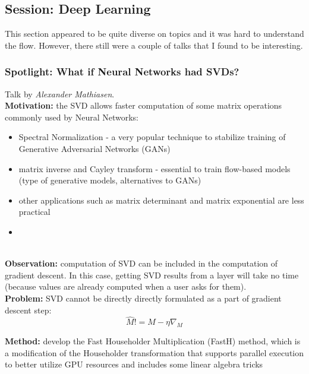 \subsection{Session: Deep Learning}

This section appeared to be quite diverse on topics and it was hard to understand the flow. However, there still were a couple of talks that I found to be interesting.

\spacerule
\subsubsection{Spotlight: What if Neural Networks had SVDs? \cite{mathiasen2020neural}}

Talk by \textit{Alexander Mathiasen}. \\

{\bf Motivation:} the SVD allows faster computation of some matrix operations commonly used by Neural Networks: 
\begin{itemize}
  \item Spectral Normalization \cite{MiyatoKKY18} - a very popular technique to stabilize training of Generative Adversarial Networks (GANs)
  \item matrix inverse and Cayley transform - essential to train flow-based models (type of generative models, alternatives to GANs) \cite{kingma2018glow}
  \item other applications such as matrix determinant and matrix exponential are less practical
  \item 
\end{itemize} \\

{\bf Observation:} computation of SVD can be included in the computation of gradient descent. 
In this case, getting SVD results from a layer will take no time (because values are already computed when a user asks for them). \\

{\bf Problem:} SVD cannot be directly directly formulated as a part of gradient descent step: 
\begin{equation} 
  \hat{M} != M - \eta\nabla_{M}
\end{equation} 

{\bf Method:} develop the Fast Householder Multiplication (FastH) method, which is a modification of the Householder transformation that supports parallel execution to better utilize GPU resources and includes some linear algebra tricks \\

